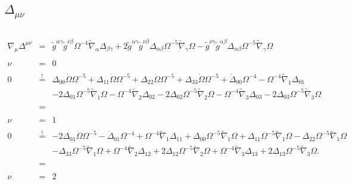 \documentclass[10pt,letterpaper]{article}
\numberwithin{equation}{section}
\begin{document}
\subsection{$\Delta_{\mu\nu}$}
\begin{eqnarray}
\\ \nonumber\\
\nabla_\mu \Delta^{\mu\nu} &=& \tilde{g}^{\alpha \gamma } \tilde{g}^{\nu \beta } \Omega^{-4} \tilde{\nabla}_{\alpha }\Delta_{\beta \gamma } + 2 \tilde{g}^{\alpha \gamma } \tilde{g}^{\nu \beta } \Delta_{\alpha \beta} \Omega^{-5} \tilde{\nabla}_{\gamma }\Omega -   \tilde{g}^{\nu \gamma }\tilde{g}^{\alpha \beta } \Delta_{\alpha\beta } \Omega^{-5} \tilde{\nabla}_{\gamma }\Omega
\\ \nonumber\\
\nu &=& 0
\\ \nonumber\\
0& \overset{!}{=}&\Delta_{00} \dot{\Omega} \Omega^{-5}
+ \Delta_{11} \dot{\Omega} \Omega^{-5}
+ \Delta_{22} \dot{\Omega} \Omega^{-5}
+ \Delta_{33} \dot{\Omega} \Omega^{-5}
+ \dot{\Delta}_{00} \Omega^{-4}
-  \Omega^{-4} \tilde{\nabla}_{1}\Delta_{01}\nonumber\\
&& - 2 \Delta_{01} \Omega^{-5} \tilde{\nabla}_{1}\Omega
-  \Omega^{-4} \tilde{\nabla}_{2}\Delta_{02}
- 2 \Delta_{02} \Omega^{-5} \tilde{\nabla}_{2}\Omega
-  \Omega^{-4} \tilde{\nabla}_{3}\Delta_{03}
- 2 \Delta_{03} \Omega^{-5} \tilde{\nabla}_{3}\Omega 
\\ \nonumber\\
&=& 
\\ \nonumber\\
\nu &=& 1
\\ \nonumber\\
0& \overset{!}{=}&-2 \Delta_{01} \dot{\Omega} \Omega^{-5}
-  \dot{\Delta}_{01} \Omega^{-4}
+ \Omega^{-4} \tilde{\nabla}_{1}\Delta_{11}
+ \Delta_{00} \Omega^{-5} \tilde{\nabla}_{1}\Omega
+ \Delta_{11} \Omega^{-5} \tilde{\nabla}_{1}\Omega
-  \Delta_{22} \Omega^{-5} \tilde{\nabla}_{1}\Omega\nonumber\\
&& -  \Delta_{33} \Omega^{-5} \tilde{\nabla}_{1}\Omega
+ \Omega^{-4} \tilde{\nabla}_{2}\Delta_{12}
+ 2 \Delta_{12} \Omega^{-5} \tilde{\nabla}_{2}\Omega
+ \Omega^{-4} \tilde{\nabla}_{3}\Delta_{13}
+ 2 \Delta_{13} \Omega^{-5} \tilde{\nabla}_{3}\Omega .
\\ \nonumber\\
&=& 
\\ \nonumber\\
\nu &=& 2

\end{eqnarray}
\end{document}

